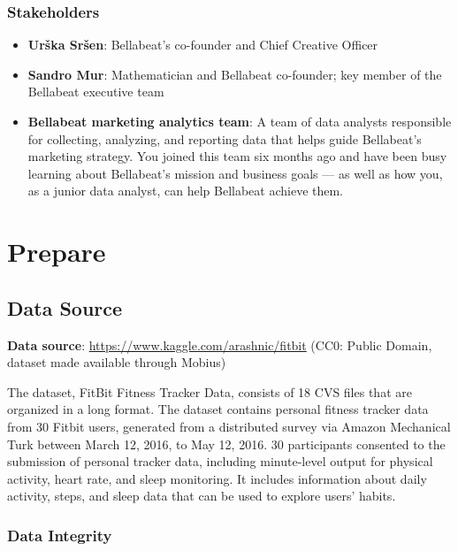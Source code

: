 \documentclass[
]{article}
\providecommand{\tightlist}{%
  \setlength{\itemsep}{0pt}\setlength{\parskip}{0pt}}
\begin{document}
\hypertarget{stakeholders}{%
\subsubsection{Stakeholders}\label{stakeholders}}

\begin{itemize}
\tightlist
\item
  \textbf{Urška Sršen}: Bellabeat's co-founder and Chief Creative
  Officer
\item
  \textbf{Sandro Mur}: Mathematician and Bellabeat co-founder; key
  member of the Bellabeat executive team
\item
  \textbf{Bellabeat marketing analytics team}: A team of data analysts
  responsible for collecting, analyzing, and reporting data that helps
  guide Bellabeat's marketing strategy. You joined this team six months
  ago and have been busy learning about Bellabeat's mission and business
  goals --- as well as how you, as a junior data analyst, can help
  Bellabeat achieve them.
\end{itemize}

\hypertarget{prepare}{%
\section{Prepare}\label{prepare}}

\hypertarget{data-source}{%
\subsection{Data Source}\label{data-source}}

\textbf{Data source}: \url{https://www.kaggle.com/arashnic/fitbit} (CC0:
Public Domain, dataset made available through Mobius)

The dataset, FitBit Fitness Tracker Data, consists of 18 CVS files that
are organized in a long format. The dataset contains personal fitness
tracker data from 30 Fitbit users, generated from a distributed survey
via Amazon Mechanical Turk between March 12, 2016, to May 12, 2016. 30
participants consented to the submission of personal tracker data,
including minute-level output for physical activity, heart rate, and
sleep monitoring. It includes information about daily activity, steps,
and sleep data that can be used to explore users' habits.

\hypertarget{data-integrity}{%
\subsubsection{Data Integrity}\label{data-integrity}}
\end{document}
